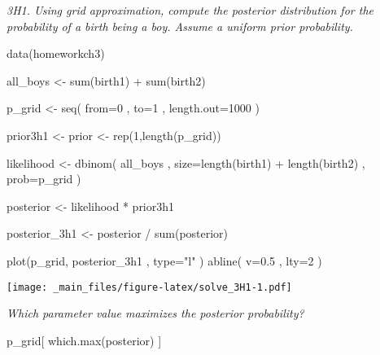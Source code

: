 \documentclass[
]{book}
\newenvironment{Shaded}{\begin{snugshade}}{\end{snugshade}}
\newcommand{\AttributeTok}[1]{\textcolor[rgb]{0.77,0.63,0.00}{#1}}
\newcommand{\DecValTok}[1]{\textcolor[rgb]{0.00,0.00,0.81}{#1}}
\newcommand{\FloatTok}[1]{\textcolor[rgb]{0.00,0.00,0.81}{#1}}
\newcommand{\FunctionTok}[1]{\textcolor[rgb]{0.00,0.00,0.00}{#1}}
\newcommand{\NormalTok}[1]{#1}
\newcommand{\OtherTok}[1]{\textcolor[rgb]{0.56,0.35,0.01}{#1}}
\newcommand{\SpecialCharTok}[1]{\textcolor[rgb]{0.00,0.00,0.00}{#1}}
\newcommand{\StringTok}[1]{\textcolor[rgb]{0.31,0.60,0.02}{#1}}
\begin{document}
\emph{3H1. Using grid approximation, compute the posterior distribution for the probability of a birth being a boy. Assume a uniform prior probability.}

\begin{Shaded}
\begin{Highlighting}[]
\FunctionTok{data}\NormalTok{(homeworkch3)}

\NormalTok{all\_boys }\OtherTok{\textless{}{-}} \FunctionTok{sum}\NormalTok{(birth1) }\SpecialCharTok{+} \FunctionTok{sum}\NormalTok{(birth2)}
\end{Highlighting}
\end{Shaded}

\begin{Shaded}
\begin{Highlighting}[]
\NormalTok{p\_grid }\OtherTok{\textless{}{-}} \FunctionTok{seq}\NormalTok{( }\AttributeTok{from=}\DecValTok{0}\NormalTok{ , }\AttributeTok{to=}\DecValTok{1}\NormalTok{ , }\AttributeTok{length.out=}\DecValTok{1000}\NormalTok{ )}

\NormalTok{prior3h1 }\OtherTok{\textless{}{-}}\NormalTok{ prior }\OtherTok{\textless{}{-}} \FunctionTok{rep}\NormalTok{(}\DecValTok{1}\NormalTok{,}\FunctionTok{length}\NormalTok{(p\_grid))}

\NormalTok{likelihood }\OtherTok{\textless{}{-}} \FunctionTok{dbinom}\NormalTok{( all\_boys , }\AttributeTok{size=}\FunctionTok{length}\NormalTok{(birth1) }\SpecialCharTok{+} \FunctionTok{length}\NormalTok{(birth2) , }\AttributeTok{prob=}\NormalTok{p\_grid )}

\NormalTok{posterior }\OtherTok{\textless{}{-}}\NormalTok{ likelihood }\SpecialCharTok{*}\NormalTok{ prior3h1}

\NormalTok{posterior\_3h1 }\OtherTok{\textless{}{-}}\NormalTok{ posterior }\SpecialCharTok{/} \FunctionTok{sum}\NormalTok{(posterior)}

\FunctionTok{plot}\NormalTok{(p\_grid, posterior\_3h1 , }\AttributeTok{type=}\StringTok{"l"}\NormalTok{ )}
\FunctionTok{abline}\NormalTok{( }\AttributeTok{v=}\FloatTok{0.5}\NormalTok{ , }\AttributeTok{lty=}\DecValTok{2}\NormalTok{ )}
\end{Highlighting}
\end{Shaded}

\texttt{[image: \_main\_files/figure-latex/solve\_3H1-1.pdf]}

\emph{Which parameter value maximizes the posterior probability?}

\begin{Shaded}
\begin{Highlighting}[]
\NormalTok{p\_grid[ }\FunctionTok{which.max}\NormalTok{(posterior) ]}
\end{Highlighting}
\end{Shaded}
\end{document}
